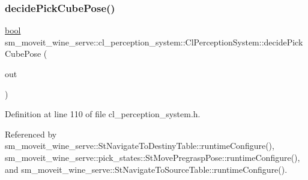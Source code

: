 \subsubsection{\texorpdfstring{decide\+Pick\+Cube\+Pose()}{decidePickCubePose()}}
{\footnotesize\ttfamily \hyperlink{classbool}{bool} sm\+\_\+moveit\+\_\+wine\+\_\+serve\+::cl\+\_\+perception\+\_\+system\+::\+Cl\+Perception\+System\+::decide\+Pick\+Cube\+Pose (\begin{DoxyParamCaption}\item[{geometry\+\_\+msgs\+::\+Pose\+Stamped \&}]{out }\end{DoxyParamCaption})\hspace{0.3cm}{\ttfamily [inline]}}



Definition at line 110 of file cl\+\_\+perception\+\_\+system.\+h.



Referenced by sm\+\_\+moveit\+\_\+wine\+\_\+serve\+::\+St\+Navigate\+To\+Destiny\+Table\+::runtime\+Configure(), sm\+\_\+moveit\+\_\+wine\+\_\+serve\+::pick\+\_\+states\+::\+St\+Move\+Pregrasp\+Pose\+::runtime\+Configure(), and sm\+\_\+moveit\+\_\+wine\+\_\+serve\+::\+St\+Navigate\+To\+Source\+Table\+::runtime\+Configure().


